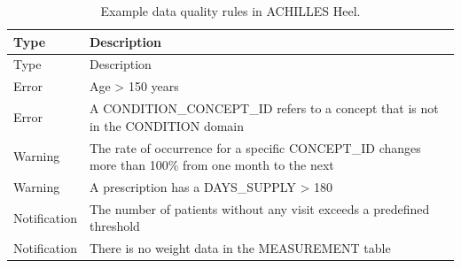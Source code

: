 \documentclass[11pt]{book}
\theoremstyle{definition}
\theoremstyle{definition}
\theoremstyle{definition}
\theoremstyle{remark}
\begin{document}
\begin{longtable}[]{@{}ll@{}}
\caption{\label{tab:heelExamples} Example data quality rules in ACHILLES Heel.}\tabularnewline
\toprule
\begin{minipage}[b]{0.15\columnwidth}\raggedright
Type\strut
\end{minipage} & \begin{minipage}[b]{0.79\columnwidth}\raggedright
Description\strut
\end{minipage}\tabularnewline
\midrule
\endfirsthead
\toprule
\begin{minipage}[b]{0.15\columnwidth}\raggedright
Type\strut
\end{minipage} & \begin{minipage}[b]{0.79\columnwidth}\raggedright
Description\strut
\end{minipage}\tabularnewline
\midrule
\endhead
\begin{minipage}[t]{0.15\columnwidth}\raggedright
Error\strut
\end{minipage} & \begin{minipage}[t]{0.79\columnwidth}\raggedright
Age \textgreater{} 150 years\strut
\end{minipage}\tabularnewline
\begin{minipage}[t]{0.15\columnwidth}\raggedright
Error\strut
\end{minipage} & \begin{minipage}[t]{0.79\columnwidth}\raggedright
A CONDITION\_CONCEPT\_ID refers to a concept that is not in the CONDITION domain\strut
\end{minipage}\tabularnewline
\begin{minipage}[t]{0.15\columnwidth}\raggedright
Warning\strut
\end{minipage} & \begin{minipage}[t]{0.79\columnwidth}\raggedright
The rate of occurrence for a specific CONCEPT\_ID changes more than 100\% from one month to the next\strut
\end{minipage}\tabularnewline
\begin{minipage}[t]{0.15\columnwidth}\raggedright
Warning\strut
\end{minipage} & \begin{minipage}[t]{0.79\columnwidth}\raggedright
A prescription has a DAYS\_SUPPLY \textgreater{} 180\strut
\end{minipage}\tabularnewline
\begin{minipage}[t]{0.15\columnwidth}\raggedright
Notification\strut
\end{minipage} & \begin{minipage}[t]{0.79\columnwidth}\raggedright
The number of patients without any visit exceeds a predefined threshold\strut
\end{minipage}\tabularnewline
\begin{minipage}[t]{0.15\columnwidth}\raggedright
Notification\strut
\end{minipage} & \begin{minipage}[t]{0.79\columnwidth}\raggedright
There is no weight data in the MEASUREMENT table\strut
\end{minipage}\tabularnewline
\bottomrule
\end{longtable}
\end{document}
